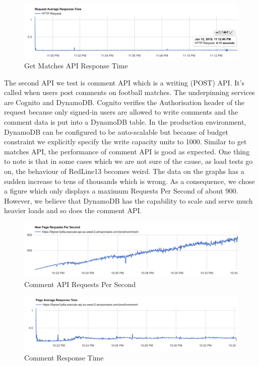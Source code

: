 \documentclass[conference]{IEEEtran}
\begin{document}
\begin{figure}[htbp]
\centerline{\includegraphics[scale=0.26]{matches-response-time.png}}
\caption{Get Matches API Response Time}
\end{figure}

The second API we test is comment API which is a writing (POST) API. It's called when users post comments on football matches. The underpinning services are Cognito and DynamoDB. Cognito verifies the Authorisation header of the request because only signed-in users are allowed to write comments and the comment data is put into a DynamoDB table. In the production environment, DynamoDB can be configured to be auto-scalable but because of budget constraint we explicitly specify the write capacity units to 1000. Similar to get matches API, the performance of comment API is good as expected. One thing to note is that in some cases which we are not sure of the cause, as load tests go on, the behaviour of RedLine13 becomes weird. The data on the graphs has a sudden increase to tens of thousands which is wrong. As a consequence, we chose a figure which only displays a maximum Requests Per Second of about 900. However, we believe that DynamoDB has the capability to scale and serve much heavier loads and so does the comment API.

\begin{figure}[htbp]
\centerline{\includegraphics[scale=0.26]{comment-qps.png}}
\caption{Comment API Requests Per Second}
\end{figure}

\begin{figure}[htbp]
\centerline{\includegraphics[scale=0.26]{comment-response-time.png}}
\caption{Comment Response Time}
\end{figure}
\end{document}
